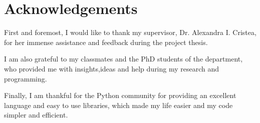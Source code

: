 \chapter[Acknowledgements]{\centering Acknowledgements}

First and foremost, I would like to thank my supervisor, Dr. Alexandra I. Cristea,
for her immense assistance and feedback during the project thesis.

I am also grateful to my classmates and the PhD students of the department,
who provided me with insights,ideas and help during my research and programming.

Finally, I am thankful for the Python community for providing an excellent language 
and easy to use libraries, which made my life easier and my code simpler and efficient.
